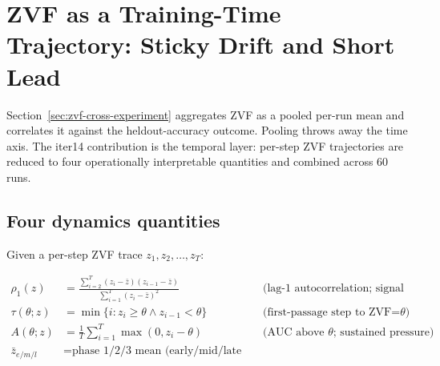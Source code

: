 %
%
%

\section{ZVF as a Training-Time Trajectory: Sticky Drift and Short Lead}
\label{sec:zvf-dynamics}

Section~\ref{sec:zvf-cross-experiment} aggregates ZVF as a pooled per-run mean and
correlates it against the heldout-accuracy outcome. Pooling throws
away the time axis. The iter14 contribution is the temporal layer:
per-step ZVF trajectories are reduced to four
operationally interpretable quantities and combined across 60 runs.

\subsection{Four dynamics quantities}

Given a per-step ZVF trace $z_1, z_2, \dots, z_T$:

\begin{align}
  \rho_1(z) &= \frac{\sum_{i=2}^{T}(z_i-\bar z)(z_{i-1}-\bar z)}{\sum_{i=1}^{T}(z_i-\bar z)^2}
              &&\text{(lag-1 autocorrelation; signal stickiness)}\\
  \tau(\theta; z) &= \min\{i : z_i \ge \theta \wedge z_{i-1} < \theta\}
              &&\text{(first-passage step to ZVF=}\theta\text{)}\\
  A(\theta; z) &= \frac{1}{T}\sum_{i=1}^{T}\max(0, z_i - \theta)
              &&\text{(AUC above }\theta\text{; sustained pressure)}\\
  \bar z_{e/m/l} &= \text{phase 1/2/3 mean (early/mid/late thirds)}
\end{align}

